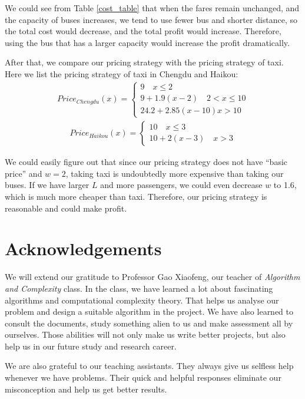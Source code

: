 \documentclass{llncs}
\begin{document}
	We could see from Table \ref{cost_table} that when the fares remain unchanged, and the capacity of buses increases, we tend to use fewer bus and shorter distance, so the total cost would decrease, and the total profit would increase. Therefore, using the bus that has a larger capacity would increase the profit dramatically.
	
	After that, we compare our pricing strategy with the pricing strategy of taxi. Here we list the pricing strategy of taxi in Chengdu and Haikou:
	\begin{align}
	Price_{Chengdu}(x)=\begin{cases}
	9\quad x\leq 2\\
	9+1.9(x-2)\quad 2<x\leq 10\\
	24.2+2.85(x-10) x>10
	\end{cases}
	\end{align}
	\begin{align}
	Price_{Haikou}(x)=\begin{cases}
	10\quad x\leq 3\\
	10+2(x-3)\quad x>3
	\end{cases}
	\end{align}
	
	We could easily figure out that since our pricing strategy does not have ``basic price'' and $w=2$, taking taxi is undoubtedly more expensive than taking our buses. If we have larger $L$ and more passengers, we could even decrease $w$ to 1.6, which is much more cheaper than taxi. Therefore, our pricing strategy is reasonable and could make profit.
	
\section{Acknowledgements}
We will extend our gratitude to Professor Gao Xiaofeng, our teacher of \textit{Algorithm and Complexity} class. In the class, we have learned a lot about fascinating algorithms and computational complexity theory. That helps us analyse our problem and design a suitable algorithm in the project. We have also learned to consult the documents, study something alien to us and make assessment all by ourselves. Those abilities will not only make us write better projects, but also help us in our future study and research career.

We are also grateful to our teaching assistants. They always give us selfless help whenever we have problems. Their quick and helpful responses eliminate our misconception and help us get better results.
\end{document}
